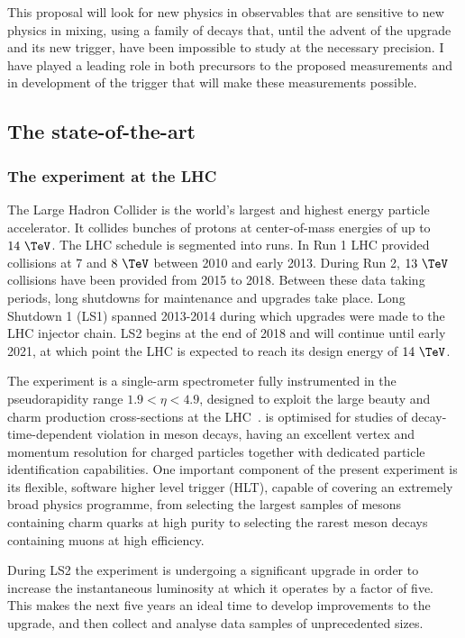 \documentclass[11pt,a4paper]{article}
\begin{document}
This proposal will look for new physics in \CP observables that are sensitive to new physics in \HepProcess{\PBs-\APBs} mixing, using a family of decays that, until the advent of the \LHCb upgrade and its new trigger, have been impossible to study at the necessary precision. I have played a leading role in both precursors to the proposed measurements and in development of the trigger that will make these measurements possible. 

\subsection{The state-of-the-art}
\subsubsection{The \LHCb experiment at the LHC}
The Large Hadron Collider is the world's largest and highest energy particle accelerator. It collides bunches of protons at center-of-mass energies of up to $14~\TeV$. The LHC schedule is segmented into runs. In Run 1 LHC provided collisions at 7 and $8~\TeV$ between 2010 and early 2013. During Run 2, $13~\TeV$ collisions have been provided from 2015 to 2018. Between these data taking periods, long shutdowns for maintenance and upgrades take place. Long Shutdown 1 (LS1) spanned 2013-2014 during which upgrades were made to the LHC injector chain. LS2 begins at the end of 2018 and will continue until early 2021, at which point the LHC is expected to reach its design energy of $14~\TeV$.

The \LHCb experiment is a single-arm spectrometer fully instrumented in the pseudorapidity range $1.9<\eta<4.9$, designed to exploit the large beauty and charm production cross-sections at the LHC~\cite{Aaij:2014jba}. \LHCb is optimised for studies of decay-time-dependent \CP violation in \PB meson decays, having an excellent vertex and momentum resolution for charged particles together with dedicated particle identification capabilities. One important component of the present \LHCb experiment is its flexible, software higher level trigger (HLT), capable of covering an extremely broad physics programme, from selecting the largest samples of mesons containing charm quarks at high purity to selecting the rarest \PB meson decays containing muons at high efficiency.

During LS2 the \LHCb experiment is undergoing a significant upgrade in order to increase the instantaneous luminosity at which it operates by a factor of five.  This makes the next five years an ideal time to develop improvements to the upgrade, and then collect and analyse data samples of unprecedented sizes.
\end{document}
